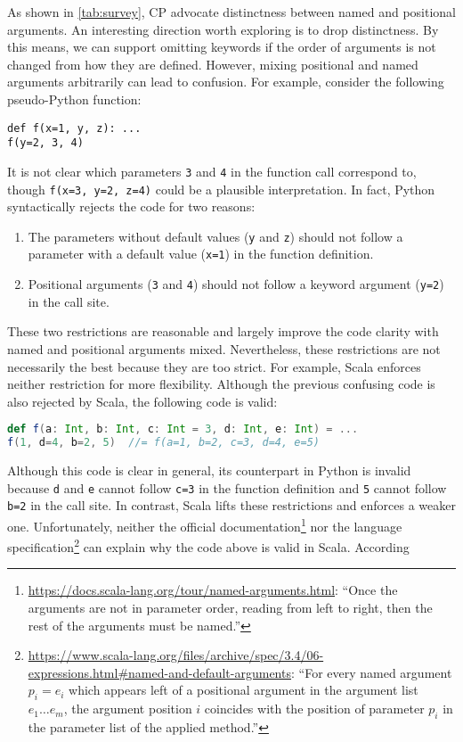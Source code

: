 As shown in \autoref{tab:survey}, CP advocate distinctness between named and
positional arguments. An interesting direction worth exploring is to drop
distinctness. By this means, we can support omitting keywords if the order of
arguments is not changed from how they are defined. However, mixing positional
and named arguments arbitrarily can lead to confusion. For example, consider the
following pseudo-Python function:
\begin{lstlisting}[language={[3]Python}]
def f(x=1, y, z): ...
f(y=2, 3, 4)
\end{lstlisting}
It is not clear which parameters \lstinline{3} and \lstinline{4} in the function
call correspond to, though \lstinline{f(x=3, y=2, z=4)} could be a plausible
interpretation. In fact, Python syntactically rejects the code for two reasons:
\begin{enumerate}
\item The parameters without default values (\lstinline{y} and \lstinline{z})
      should not follow a parameter with a default value (\lstinline{x=1}) in
      the function definition.
\item Positional arguments (\lstinline{3} and \lstinline{4}) should not follow
      a keyword argument (\lstinline{y=2}) in the call site.
\end{enumerate}
These two restrictions are reasonable and largely improve the code clarity with
named and positional arguments mixed. Nevertheless, these restrictions are not
necessarily the best because they are too strict. For example, Scala enforces
neither restriction for more flexibility. Although the previous confusing code
is also rejected by Scala, the following code is valid:
\begin{lstlisting}[language=Scala,otherkeywords={}]
def f(a: Int, b: Int, c: Int = 3, d: Int, e: Int) = ...
f(1, d=4, b=2, 5)  //= f(a=1, b=2, c=3, d=4, e=5)
\end{lstlisting}
Although this code is clear in general, its counterpart in Python is invalid
because \lstinline{d} and \lstinline{e} cannot follow \lstinline{c=3} in the
function definition and \lstinline{5} cannot follow \lstinline{b=2} in the call
site. In contrast, Scala lifts these restrictions and enforces a weaker one.
Unfortunately, neither the official
documentation\footnote{\url{https://docs.scala-lang.org/tour/named-arguments.html}:
``Once the arguments are not in parameter order, reading from left to right,
then the rest of the arguments must be named.''} nor the language
specification\footnote{\url{https://www.scala-lang.org/files/archive/spec/3.4/06-expressions.html\#named-and-default-arguments}:
``For every named argument $p_i = e_i$ which appears left of a positional
argument in the argument list $e_1 \dots e_m$, the argument position $i$
coincides with the position of parameter $p_i$ in the parameter list of the
applied method.''} can explain why the code above is valid in Scala. According
